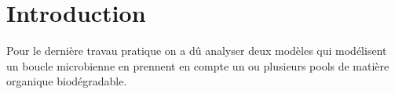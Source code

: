 \section{Introduction}

\par{
Pour le dernière travau pratique on a dû analyser deux modèles qui modélisent un boucle microbienne en
prennent en compte un ou plusieurs pools de matière organique biodégradable.
}
